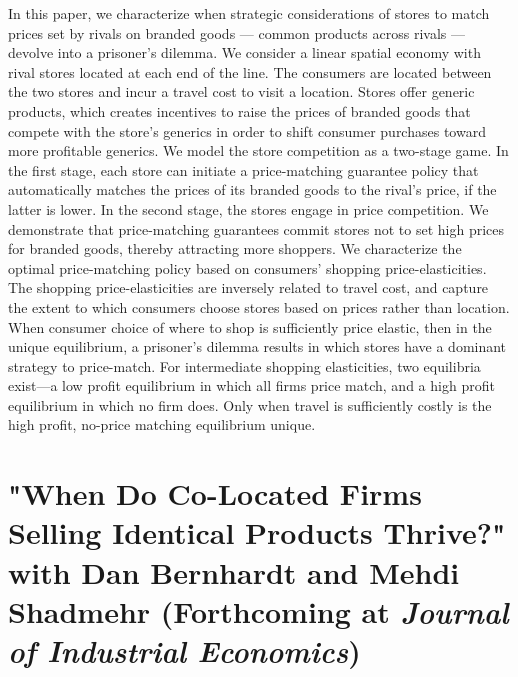 \documentclass[12pt]{article}
\begin{document}
\noindent In this paper, we characterize when strategic considerations of stores to match prices set by rivals on branded goods --- common products across rivals --- devolve into a prisoner’s dilemma.
We consider a linear spatial economy with rival stores located at each end of the line.
The consumers are located between the two stores and incur a travel cost to visit a location.
Stores offer generic products, which creates incentives to raise the prices of branded goods that compete with the store's generics in order to shift consumer purchases toward more profitable generics.
We model the store competition as a two-stage game.
In the first stage, each store can initiate a price-matching guarantee policy that automatically matches the prices of its branded goods to the rival's price, if the latter is lower.
In the second stage, the stores engage in price competition.
We demonstrate that price-matching guarantees commit stores not to set high prices for branded goods, thereby attracting more shoppers.
We characterize the optimal price-matching policy based on consumers' shopping price-elasticities.
The shopping price-elasticities are inversely related to travel cost, and capture the extent to which consumers choose stores based on prices rather than location.
When consumer choice of where to shop is sufficiently price elastic, then in the unique equilibrium, a prisoner’s dilemma results in which stores have a dominant strategy to price-match.
For intermediate shopping elasticities, two equilibria exist—a low profit equilibrium in which all firms price match, and a high profit equilibrium in which no firm does.
Only when travel is sufficiently costly is the high profit, no-price matching equilibrium unique.

\vspace{0.35cm}
\section{"When Do Co-Located Firms Selling Identical Products Thrive?" with Dan Bernhardt and Mehdi Shadmehr (Forthcoming at \emph{Journal of Industrial Economics})}
\label{sec:org5af3b06}
\vspace{0.15cm}
\end{document}
